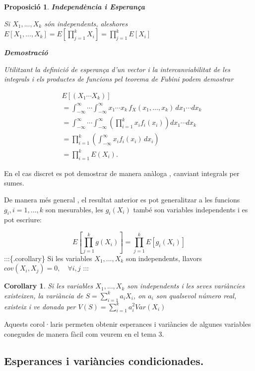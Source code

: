 \documentclass[
  catalan,
]{article}
\newtheorem{corollary}{Corollary}[section]
\newtheorem{proposition}{Proposició}[section]
\theoremstyle{definition}
\theoremstyle{definition}
\theoremstyle{definition}
\theoremstyle{definition}
\theoremstyle{remark}
\begin{document}
\begin{proposition}
\textbf{Independència i Esperança}

Si \(X_1,...,X_k\) són independents, aleshores \(E[X_1,...,X_k]=E[\prod_{j=1}^{k}X_i]=\prod_{j=1}^{k}E[X_i]\) \label{eq:indep}

\textbf{Demostració}

Utilitzant la definició de esperança d'un vector i la intercanviabilitat de les integrals i els productes de funcions pel teorema de Fubini podem demostrar

\[
\begin{aligned}
& E[(X_1\cdots X_k)] \\
&=
\int_{-\infty}^{\infty}\cdots
\int_{-\infty}^{\infty}
x_1\cdots x_k\,
f_X(x_1,\ldots,x_k)\,
dx_1\cdots dx_k \\
&=
\int_{-\infty}^{\infty}\cdots
\int_{-\infty}^{\infty}
\left(
\prod_{i=1}^{k} x_i f_i(x_i)
\right)
dx_1\cdots dx_k \\
&=
\prod_{i=1}^{k}
\left(
\int_{-\infty}^{\infty}
x_i f_i(x_i)\,dx_i
\right) \\
&=
\prod_{i=1}^{k}
E(X_i).
\end{aligned}
\]
\end{proposition}

En el cas discret es pot demostrar de manera anàloga , canviant integrals per sumes.

De manera més general , el resultat anterior es pot generalitzar a les funcions \(g_i,i=1,...,k\) son mesurables, les \(g_i(X_i)\) també son variables independents i es pot escriure:

\[
E[\prod_{j=1}^{k}g(X_i)]=\prod_{j=1}^{k}E[g_i(X_i)]\label{eq:gindep}
\]
:::\{.corollary\}
Si les variables \(X_1,...,X_k\) son independents, llavors \(cov(X_i,X_j)=0, \quad \forall i,j\)
:::

\begin{corollary}
Si les variables \(X_1,...,X_k\) son independents i les seves variàncies existeixen, la variància de \(S=\sum_{i=1}^k a_i X_i\), on \(a_i\) son qualsevol número real, existeix i ve donada per \(V(S)= \sum_{i=1}^k a_i^2  Var(X_i)\)
\end{corollary}

Aquests corol·laris permeten obtenir esperances i variàncies de algunes variables conegudes de manera fàcil com veurem en el tema 3.

\subsection{Esperances i variàncies condicionades.}\label{esperances-i-variuxe0ncies-condicionades.}
\end{document}
